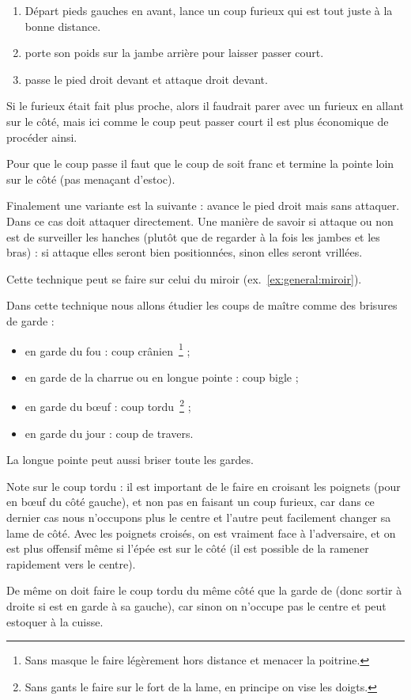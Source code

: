 \begin{technique}

\begin{enumerate}
	\item Départ pieds gauches en avant, \A lance un coup furieux qui est tout juste à la bonne distance.
	\item \D porte son poids sur la jambe arrière pour laisser passer court.
	\item \D passe le pied droit devant et attaque droit devant.
\end{enumerate}

Si le furieux était fait plus proche, alors il faudrait parer avec un furieux en allant sur le côté, mais ici comme le coup peut passer court il est plus économique de procéder ainsi.

Pour que le coup passe il faut que le coup de \D soit franc et termine la pointe loin sur le côté (pas menaçant d'estoc).

Finalement une variante est la suivante : \A avance le pied droit mais sans attaquer. Dans ce cas \D doit attaquer directement. Une manière de savoir si \A attaque ou non est de surveiller les hanches (plutôt que de regarder à la fois les jambes et les bras) : si \A attaque elles seront bien positionnées, sinon elles seront vrillées.

Cette technique peut se faire sur celui du miroir (ex.~\ref{ex:general:miroir}).
\end{technique}


\begin{technique}
Dans cette technique nous allons étudier les coups de maître comme des brisures de garde :
\begin{itemize}
	\item \D en garde du fou : coup crânien~\footnote{Sans masque le faire légèrement hors distance et menacer la poitrine.} ;
	\item \D en garde de la charrue ou en longue pointe : coup bigle ;
	\item \D en garde du bœuf : coup tordu~\footnote{Sans gants le faire sur le fort de la lame, en principe on vise les doigts.} ;
	\item \D en garde du jour : coup de travers.
\end{itemize}
La longue pointe peut aussi briser toute les gardes.

Note sur le coup tordu : il est important de le faire en croisant les poignets (pour \D en bœuf du côté gauche), et non pas en faisant un coup furieux, car dans ce dernier cas nous n'occupons plus le centre et l'autre peut facilement changer sa lame de côté. Avec les poignets croisés, on est vraiment face à l'adversaire, et on est plus offensif même si l'épée est sur le côté (il est possible de la ramener rapidement vers le centre).

De même on doit faire le coup tordu du même côté que la garde de \D (donc sortir à droite si \D est en garde à sa gauche), car sinon on n'occupe pas le centre et \D peut estoquer à la cuisse.

\end{technique}


